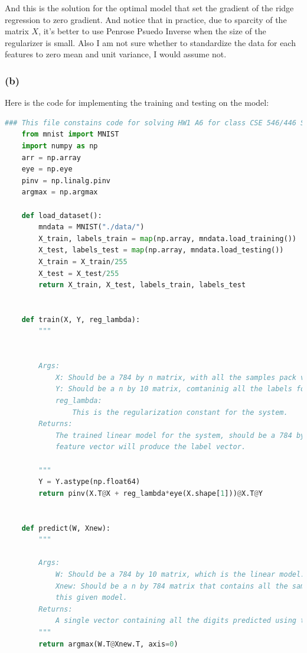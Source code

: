 \documentclass[]{article}
\begin{document}
            And this is the solution for the optimal model that set the gradient of the ridge regression to zero gradient. And notice that in practice, due to sparcity of the matrix $X$, it's better to use Penrose Psuedo Inverse when the size of the regularizer is small. Also I am not sure whether to standardize the data for each features to zero mean and unit variance, I would assume not. 
            
            
            
        \subsubsection*{(b)}
            Here is the code for implementing the training and testing on the model: 
            \begin{lstlisting}[language=python]
    ### This file constains code for solving HW1 A6 for class CSE 546/446 SPRING 2021.
    from mnist import MNIST
    import numpy as np
    arr = np.array
    eye = np.eye
    pinv = np.linalg.pinv
    argmax = np.argmax

    def load_dataset():
        mndata = MNIST("./data/")
        X_train, labels_train = map(np.array, mndata.load_training())
        X_test, labels_test = map(np.array, mndata.load_testing())
        X_train = X_train/255
        X_test = X_test/255
        return X_train, X_test, labels_train, labels_test


    def train(X, Y, reg_lambda):
        """


        Args:
            X: Should be a 784 by n matrix, with all the samples pack vertically as rows into the matrix.
            Y: Should be a n by 10 matrix, comtaninig all the labels for the digits pack vertically as rows for the matrix.
            reg_lambda:
                This is the regularization constant for the system.
        Returns:
            The trained linear model for the system, should be a 784 by 10 matrix such that its transpose multiply by the
            feature vector will produce the label vector.

        """
        Y = Y.astype(np.float64)
        return pinv(X.T@X + reg_lambda*eye(X.shape[1]))@X.T@Y


    def predict(W, Xnew):
        """

        Args:
            W: Should be a 784 by 10 matrix, which is the linear model.
            Xnew: Should be a n by 784 matrix that contains all the samples we want to to predict with using
            this given model.
        Returns:
            A single vector containing all the digits predicted using this model.
        """
        return argmax(W.T@Xnew.T, axis=0)



\end{lstlisting}
\end{document}
